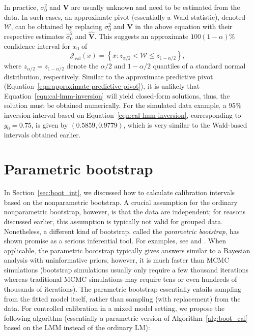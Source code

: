 \documentclass[cmfont,usenames,dvipsnames,leqno]{afit-etd}\usepackage[]{graphicx}\usepackage[]{color}
\newcommand{\mc}[1]{\ensuremath{\mathcal{#1}}}
\newcommand{\wh}[1]{\ensuremath{\widehat{#1}}}
\begin{document}
In practice, $\sigma_0^2$ and $\bm{V}$ are usually unknown and need to be estimated from the data. In such cases, an approximate pivot (essentially a Wald statistic), denoted $\mc{W}$, can be obtained by replacing $\sigma_0^2$ and $\bm{V}$ in the above equation with their respective estimates $\wh{\sigma}_0^2$ and $\wh{\bm{V}}$. This suggests an approximate $100(1-\alpha)\%$ confidence interval for $x_0$ of
\begin{equation}
\label{eqn:cal-lmm-inversion}
  \mc{J}_\mathrm{cal}(x) = \left\{ x: z_{\alpha/2} < \mc{W} \le z_{1-\alpha/2} \right\},
\end{equation}
where $z_{\alpha/2} = z_{1-\alpha/2}$ denote the $\alpha/2$ and $1 - \alpha/2$ quantiles of a standard normal distribution, respectively. Similar to the approximate predictive pivot (Equation~\eqref{eqn:approximate-predictive-pivot}), it is unlikely that Equation~\eqref{eqn:cal-lmm-inversion} will yield closed-form solutions, thus, the solution must be obtained numerically. For the simulated data example, a 95\% inversion interval based on Equation~\eqref{eqn:cal-lmm-inversion}, corresponding to $y_0 = 0.75$, is given by $(0.5859, 0.9779)$, which is very similar to the Wald-based intervals obtained earlier.

\section{Parametric bootstrap}
\label{sec:calibration-lmm-parboot}
In Section~\ref{sec:boot_int}, we discussed how to calculate calibration intervals based on the nonparametric bootstrap. A crucial assumption for the ordinary nonparametric bootstrap, however, is that the data are independent; for reasons discussed earlier, this assumption is typically not valid for grouped data. Nonetheless, a different kind of bootstrap, called the \textit{parametric bootstrap}, has shown promise as a serious inferential tool. For examples, see \citet[pg. 342]{mcculloch_generalized_2008} and \citet{efron_bootstrap_2011}. When applicable, the parametric bootstrap typically gives answers similar to a Bayesian analysis with uninformative priors, however, it is much faster than MCMC simulations (bootstrap simulations usually only require a few thousand iterations whereas traditional MCMC simulations may require tens or even hundreds of thousands of iterations). The parametric bootstrap essentially entails sampling from the fitted model itself, rather than sampling (with replacement) from the data. For controlled calibration in a mixed model setting, we propose the following algorithm (essentially a parametric version of Algorithm~\ref{alg:boot_cal} based on the \ac{LMM} instead of the ordinary LM):
\end{document}
